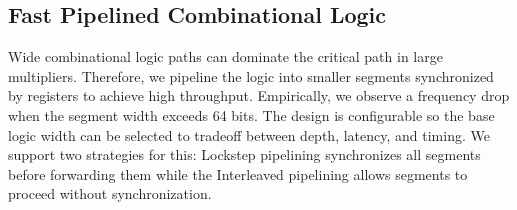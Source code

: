 \subsection{Fast Pipelined Combinational Logic} \label{sec_fast_pipelined_comb_logic}
Wide combinational logic paths can dominate the critical path in large multipliers.
Therefore, we pipeline the logic into smaller segments synchronized by registers to achieve high throughput.
Empirically, we observe a frequency drop when the segment width exceeds 64 bits.
The design is configurable so the base logic width can be selected to tradeoff between depth, latency, and timing.
We support two strategies for this:
Lockstep pipelining synchronizes all segments before forwarding them while the Interleaved pipelining allows segments to proceed without synchronization.